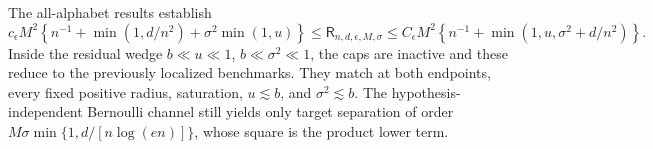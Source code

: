 The all-alphabet results establish
\[
 c_{\epsilon}M^2\left\{n^{-1}+\min(1,d/n^2)+\sigma^2\min(1,u)\right\}
 \le \mathsf R_{n,d,\epsilon,M,\sigma}
 \le C_{\epsilon}M^2\left\{n^{-1}+\min(1,u,\sigma^2+d/n^2)\right\}.
\]
Inside the residual wedge \(b\ll u\ll1\), \(b\ll\sigma^2\ll1\), the caps are inactive and these reduce to the previously localized benchmarks.  They match at both endpoints, every fixed positive radius, saturation, \(u\lesssim b\), and \(\sigma^2\lesssim b\).  The hypothesis-independent Bernoulli channel still yields only target separation of order \(M\sigma\min\{1,d/[n\log(en)]\}\), whose square is the product lower term.